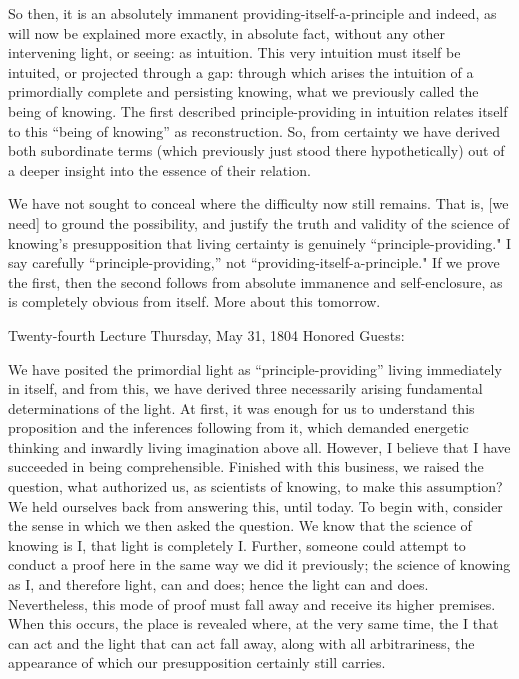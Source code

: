So then, it is an absolutely immanent
providing-itself-a-principle and indeed,
as will now be explained more exactly,
in absolute fact,
without any other intervening light,
or seeing: as intuition.
This very intuition must itself be intuited,
or projected through a gap:
through which arises the intuition of
a primordially complete and persisting knowing,
what we previously called the being of knowing.
The first described principle-providing in intuition
relates itself to this “being of knowing” as reconstruction.
So, from certainty we have derived both subordinate terms
(which previously just stood there hypothetically)
out of a deeper insight into the essence of their relation.

We have not sought to conceal
where the difficulty now still remains.
That is, [we need] to ground the possibility,
and justify the truth and validity
of the science of knowing's presupposition that
living certainty is genuinely “principle-providing."
I say carefully “principle-providing,”
not “providing-itself-a-principle."
If we prove the first, then the second follows
from absolute immanence and self-enclosure,
as is completely obvious from itself.
More about this tomorrow.

Twenty-fourth Lecture
Thursday, May 31, 1804
Honored Guests:

We have posited the primordial light
as “principle-providing”
living immediately in itself,
and from this, we have derived
three necessarily arising fundamental
determinations of the light.
At first, it was enough for us
to understand this proposition
and the inferences following from it,
which demanded energetic thinking and
inwardly living imagination above all.
However, I believe that I have succeeded in being comprehensible.
Finished with this business, we raised the question,
what authorized us, as scientists of knowing,
to make this assumption?
We held ourselves back from answering this, until today.
To begin with, consider the sense
in which we then asked the question.
We know that the science of knowing is I,
that light is completely I.
Further, someone could attempt to conduct a proof here
in the same way we did it previously;
the science of knowing as I, and therefore light, can and does;
hence the light can and does.
Nevertheless, this mode of proof must fall away
and receive its higher premises.
When this occurs, the place is revealed where,
at the very same time,
the I that can act and the light that can act fall away,
along with all arbitrariness,
the appearance of which our presupposition
certainly still carries.

